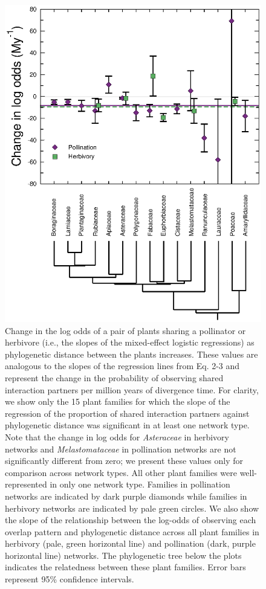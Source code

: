 \documentclass[12pt]{article}
\begin{document}
  \begin{figure}[!h]
    \begin{center}
      \centerline{\includegraphics*[height=.62\textheight]{Figures/dataplots/Family/allfams_full.eps}}
    \end{center}
    \caption{Change in the log odds of a pair of plants sharing a pollinator or herbivore (i.e., the slopes of the mixed-effect logistic regressions) as phylogenetic distance between the plants increases. These values are analogous to the slopes of the regression lines from Eq. 2-3 and represent
    the change in the probability of observing shared 
    interaction partners per million years of divergence time. 
    For clarity, we show only the 15 plant families for which the slope of the regression of the proportion of shared interaction partners against phylogenetic distance was significant in at least one network type. 
    Note that the change in log odds for \emph{Asteraceae} in herbivory networks and \emph{Melastomataceae} in pollination networks are not significantly different from zero; we present these values only for comparison across network types. All other plant families were well-represented in only one network type.
    Families in pollination networks are indicated
    by dark purple diamonds while families in herbivory
    networks are indicated by pale green circles.
    We also
    show the slope of the relationship between the
    log-odds of observing each overlap pattern and 
    phylogenetic distance across all plant families
    in herbivory (pale, green horizontal line) and
    pollination (dark, purple horizontal line) networks.
    The phylogenetic tree below the plots indicates the
    relatedness between these plant families. Error bars represent 95\% 
    confidence intervals.}
    \label{within_family_regression}
  \end{figure}
\end{document}
